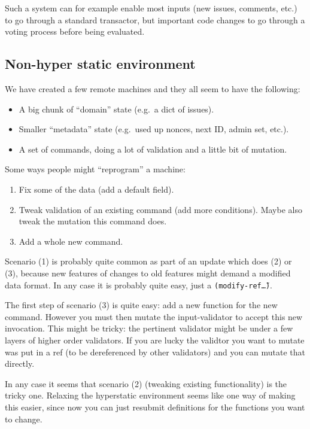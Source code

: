 \documentclass[a4paper, oneside, 10pt]{amsart}
\begin{document}
Such a system can for example enable most inputs (new issues, comments, etc.) to
go through a standard transactor, but important code changes to go through a
voting process before being evaluated.

\subsection{Non-hyper static environment}

We have created a few remote machines and they all seem to have the
following:
\begin{itemize}
\item
  A big chunk of ``domain'' state (e.g.~a dict of issues).
\item
  Smaller ``metadata'' state (e.g.~used up nonces, next ID, admin set,
  etc.).
\item
  A set of commands, doing a lot of validation and a little bit of
  mutation.
\end{itemize}

Some ways people might ``reprogram'' a machine:
\begin{enumerate}
\def\labelenumi{\arabic{enumi}.}
\item
  Fix some of the data (add a default field).
\item
  Tweak validation of an existing command (add more conditions). Maybe
  also tweak the mutation this command does.
\item
  Add a whole new command.
\end{enumerate}

Scenario (1) is probably quite common as part of an update which does
(2) or (3), because new features of changes to old features might demand
a modified data format. In any case it is probably quite easy, just a
\texttt{(modify-ref\~\ldots)}.

The first step of scenario (3) is quite easy: add a new function for the
new command. However you must then mutate the input-validator to accept
this new invocation. This might be tricky: the pertinent validator might
be under a few layers of higher order validators. If you are lucky the
validtor you want to mutate was put in a ref (to be dereferenced by
other validators) and you can mutate that directly.

In any case it seems that scenario (2) (tweaking existing functionality)
is the tricky one. Relaxing the hyperstatic environment seems like one
way of making this easier, since now you can just resubmit definitions
for the functions you want to change.
\end{document}
